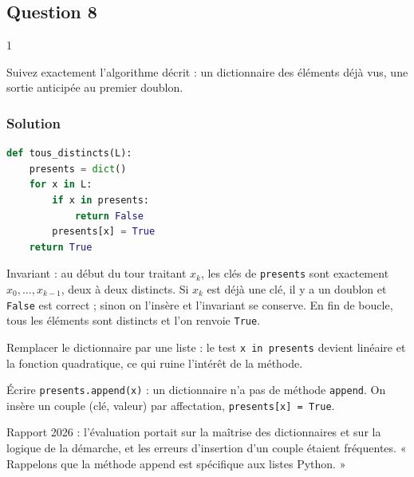 \documentclass[11pt,a4paper]{article}
\begin{document}
\hypertarget{question-8}{%
\subsection{Question 8}\label{question-8}}

\begin{indication}{1}

Suivez exactement l'algorithme décrit : un dictionnaire des éléments déjà vus, une sortie anticipée au premier doublon.

\end{indication}

\hypertarget{solution-7}{%
\subsubsection{Solution}\label{solution-7}}

\begin{lstlisting}[language=Python]
def tous_distincts(L):
    presents = dict()
    for x in L:
        if x in presents:
            return False
        presents[x] = True
    return True
\end{lstlisting}

Invariant : au début du tour traitant \(x_k\), les clés de \texttt{presents} sont exactement \(x_0, \dots, x_{k-1}\), deux à deux distincts. Si \(x_k\) est déjà une clé, il y a un doublon et \texttt{False} est correct ; sinon on l'insère et l'invariant se conserve. En fin de boucle, tous les éléments sont distincts et l'on renvoie \texttt{True}.

\begin{piege}

Remplacer le dictionnaire par une liste : le test \texttt{x\ in\ presents} devient linéaire et la fonction quadratique, ce qui ruine l'intérêt de la méthode.

\end{piege}

\begin{piege}

Écrire \texttt{presents.append(\allowbreak{}x)\allowbreak{}} : un dictionnaire n'a pas de méthode \texttt{append}. On insère un couple (clé, valeur) par affectation, \texttt{presents{[}x{]}\allowbreak{}\ =\allowbreak{}\ True}.

\end{piege}

\begin{jury}

Rapport 2026 : l'évaluation portait sur la maîtrise des dictionnaires et sur la logique de la démarche, et les erreurs d'insertion d'un couple étaient fréquentes. « Rappelons que la méthode append est spécifique aux listes Python. »

\end{jury}
\end{document}
